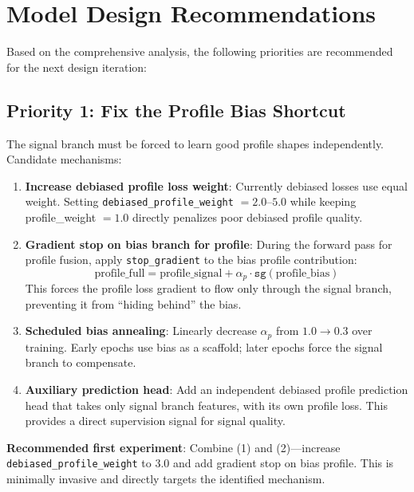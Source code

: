 \documentclass[11pt,a4paper]{article}
\begin{document}
\section{Model Design Recommendations}
\label{sec:recommendations}

Based on the comprehensive analysis, the following priorities are recommended for the next design iteration:

\subsection{Priority 1: Fix the Profile Bias Shortcut}

The signal branch must be forced to learn good profile shapes independently. Candidate mechanisms:

\begin{enumerate}
\item \textbf{Increase debiased profile loss weight}: Currently debiased losses use equal weight. Setting \texttt{debiased\_profile\_weight} $= 2.0$--$5.0$ while keeping profile\_weight $= 1.0$ directly penalizes poor debiased profile quality.

\item \textbf{Gradient stop on bias branch for profile}: During the forward pass for profile fusion, apply \texttt{stop\_gradient} to the bias profile contribution:
$$\text{profile\_full} = \text{profile\_signal} + \alpha_p \cdot \texttt{sg}(\text{profile\_bias})$$
This forces the profile loss gradient to flow only through the signal branch, preventing it from ``hiding behind'' the bias.

\item \textbf{Scheduled bias annealing}: Linearly decrease $\alpha_p$ from $1.0 \to 0.3$ over training. Early epochs use bias as a scaffold; later epochs force the signal branch to compensate.

\item \textbf{Auxiliary prediction head}: Add an independent debiased profile prediction head that takes only signal branch features, with its own profile loss. This provides a direct supervision signal for signal quality.
\end{enumerate}

\textbf{Recommended first experiment}: Combine (1) and (2)---increase \texttt{debiased\_profile\_weight} to $3.0$ and add gradient stop on bias profile. This is minimally invasive and directly targets the identified mechanism.
\end{document}
